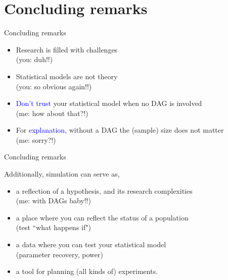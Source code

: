 \section{Concluding remarks}
%
\begin{frame}[negative]
	\sectionpage
\end{frame}
%
%
\begin{lhframe}[rhgraphic={\texttt{[image: think1.jpg]}}]
	{Concluding remarks}
	
	\begin{itemize}
		\item Research is filled with challenges \\
		{\small (you: duh!!) }
		\item Statistical models are not theory \\
		{\small (you: so obvious again!!) }
		\item \textcolor{blue}{Don't trust} your statistical model when no DAG is involved \\
		{\small (me: how about that?!) }
		\item For \textcolor{blue}{explanation}, without a DAG the (sample) size does not matter \\
		{\small (me: sorry?!) }
	\end{itemize} 
\end{lhframe}
%
%
\begin{lhframe}[rhgraphic={\texttt{[image: think2.jpg]}}]
	{Concluding remarks}
	
	Additionally, simulation can serve as,
	\begin{itemize}
		\item a reflection of a hypothesis, and its research complexities\\
		{\small (me: with DAGs baby!!)}
		\item a place where you can reflect the status of a population \\
		{\small (test ``what happens if") }
		\item a data where you can test your statistical model \\
		{\small (parameter recovery, power) }
		\item a tool for planning (all kinds of) experiments.
	\end{itemize} 
\end{lhframe}
%
%